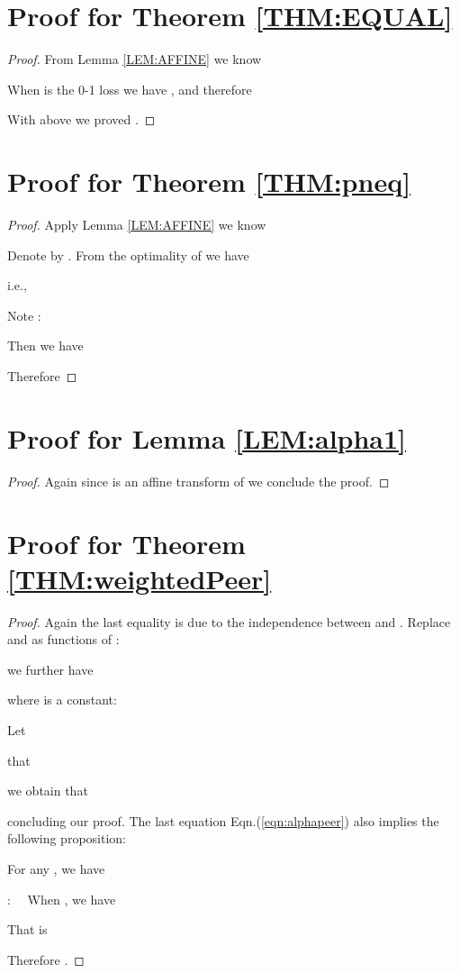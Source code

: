 \section*{Proof for Theorem \ref{THM:EQUAL}}
\begin{proof}
From Lemma \ref{LEM:AFFINE} we know

  When  is the 0-1 loss we have , and therefore
 
With above we proved .
\end{proof}
\section*{Proof for Theorem \ref{THM:pneq}}

\begin{proof}




Apply Lemma \ref{LEM:AFFINE} we know

Denote by . From the optimality of  we have

i.e., 

Note :

Then we have

Therefore

\end{proof}

\section*{Proof for Lemma \ref{LEM:alpha1}}

\begin{proof}


Again since  is an affine transform of  we conclude the proof.
\end{proof}

\section*{Proof for Theorem \ref{THM:weightedPeer}}

\begin{proof}


Again the last equality is due to the independence between  and . Replace  and  as functions of :

we further have

where  is a constant:


Let 
 
that

we obtain that


concluding our proof. The last equation Eqn.(\ref{eqn:alphapeer}) also implies the following proposition: 
\begin{proposition}\label{prop:alpha}
For any , we have

\end{proposition}

\noindent : ~~When , we have

That is 

Therefore .
\end{proof}

